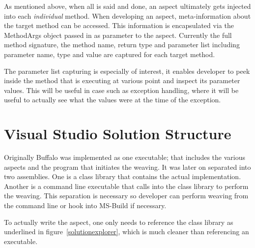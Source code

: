 As mentioned above, when all is said and done, an aspect ultimately gets injected into each \textit{individual} method. When developing an aspect, meta-information about the target method can be accessed. This information is encapsulated via the MethodArgs object passed in as parameter to the aspect. Currently the full method signature, the method name, return type and parameter list including parameter name, type and value are captured for each target method.

The parameter list capturing is especially of interest, it enables developer to peek inside the method that is executing at various point and inspect its parameter values. This will be useful in case such as exception handling, where it will be useful to actually see what the values were at the time of the exception.

\section{Visual Studio Solution Structure}

Originally Buffalo was implemented as one executable; that includes the various aspects and the program that initiates the weaving. It was later on separated into two assemblies. One is a class library that contains the actual implementation. Another is a command line executable that calls into the class library to perform the weaving. This separation is necessary so developer can perform weaving from the command line or hook into MS-Build if necessary. 

To actually write the aspect, one only needs to reference the class library as underlined in figure~\ref{solutionexplorer}, which is much cleaner than referencing an executable.

